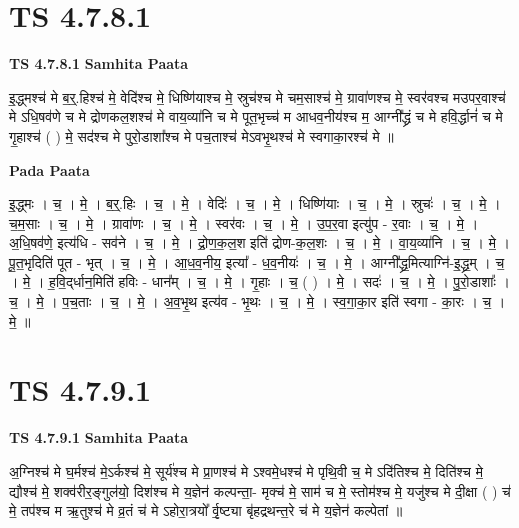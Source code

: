 \documentclass[17pt]{extarticle}
\begin{document}

\section{ TS 4.7.8.1 }

\textbf{TS 4.7.8.1 } \newline
\textbf{Samhita Paata} \newline

इ॒द्ध्मश्च॑ मे ब॒र्॒.हिश्च॑ मे॒ वेदि॑श्च मे॒ धिष्णि॑याश्च मे॒ स्रुच॑श्च मे चम॒साश्च॑ मे॒ ग्रावा॑णश्च मे॒ स्वर॑वश्च मउपर॒वाश्च॑ मे ऽधि॒षव॑णे च मे द्रोणकल॒शश्च॑ मे वाय॒व्या॑नि च मे पूत॒भृच्च॑ म आधव॒नीय॑श्च म॒ आग्नी᳚द्ध्रं च मे हवि॒र्द्धानं॑ च मे गृ॒हाश्च॑ ( ) मे॒ सद॑श्च मे पुरो॒डाशा᳚श्च मे पच॒ताश्च॑ मेऽवभृ॒थश्च॑ मे स्वगाका॒रश्च॑ मे ॥ \newline

\textbf{Pada Paata} \newline

इ॒द्ध्मः । च॒ । मे॒ । ब॒र्॒.हिः । च॒ । मे॒ । वेदिः॑ । च॒ । मे॒ । धिष्णि॑याः । च॒ । मे॒ । स्रुचः॑ । च॒ । मे॒ । च॒म॒साः । च॒ । मे॒ । ग्रावा॑णः । च॒ । मे॒ । स्वर॑वः । च॒ । मे॒ । उ॒प॒र॒वा इत्यु॑प - र॒वाः । च॒ । मे॒ । अ॒धि॒षव॑णे॒ इत्य॑धि - सव॑ने । च॒ । मे॒ । द्रो॒ण॒क॒ल॒श इति॑ द्रोण-क॒ल॒शः । च॒ । मे॒ । वा॒य॒व्या॑नि । च॒ । मे॒ । पू॒त॒भृदिति॑ पूत - भृत् । च॒ । मे॒ । आ॒ध॒व॒नीय॒ इत्या᳚ - ध॒व॒नीयः॑ । च॒ । मे॒ । आग्नी᳚द्ध्र॒मित्याग्नि॑-इ॒द्ध्र॒म् । च॒ । मे॒ । ह॒वि॒द्‌र्धान॒मिति॑ हविः - धान᳚म् । च॒ । मे॒ । गृ॒हाः । च॒ ( ) । मे॒ । सदः॑ । च॒ । मे॒ । पु॒रो॒डाशाः᳚ । च॒ । मे॒ । प॒च॒ताः । च॒ । मे॒ । अ॒व॒भृ॒थ इत्य॑व - भृ॒थः । च॒ । मे॒ । स्व॒गा॒का॒र इति॑ स्वगा - का॒रः । च॒ । मे॒ ॥  \newline





\section{ TS 4.7.9.1 }

\textbf{TS 4.7.9.1 } \newline
\textbf{Samhita Paata} \newline

अ॒ग्निश्च॑ मे घ॒र्मश्च॑ मे॒ऽर्कश्च॑ मे॒ सूर्य॑श्च मे प्रा॒णश्च॑ मे ऽश्वमे॒धश्च॑ मे पृथि॒वी च॒ मे ऽदि॑तिश्च मे॒ दिति॑श्च मे॒ द्यौश्च॑ मे॒ शक्व॑रीर॒ङ्गुल॑यो॒ दिश॑श्च मे     य॒ज्ञेन॑ कल्पन्ता॒- मृक्च॑ मे॒ साम॑ च मे॒ स्तोम॑श्च मे॒ यजु॑श्च मे दी॒क्षा ( ) च॑ मे॒ तप॑श्च म ऋ॒तुश्च॑ मे व्र॒तं च॑ मे ऽहोरा॒त्रयो᳚ र्वृ॒ष्ट्या बृ॑हद्रथन्त॒रे च॑ मे य॒ज्ञेन॑ कल्पेतां ॥ \newline
\end{document}
